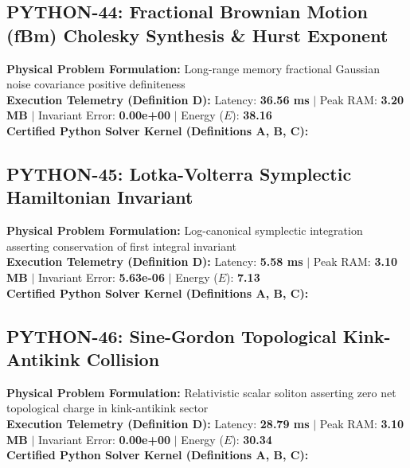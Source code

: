 \subsection{PYTHON-44: Fractional Brownian Motion (fBm) Cholesky Synthesis \& Hurst Exponent}
\textbf{Physical Problem Formulation:} Long-range memory fractional Gaussian noise covariance positive definiteness\\
\textbf{Execution Telemetry (Definition D):} Latency: \textbf{36.56 ms} $|$ Peak RAM: \textbf{3.20 MB} $|$ Invariant Error: \textbf{0.00e+00} $|$ Energy ($E$): \textbf{38.16}\\

\textbf{Certified Python Solver Kernel (Definitions A, B, C):}


\vspace{1em}
\subsection{PYTHON-45: Lotka-Volterra Symplectic Hamiltonian Invariant}
\textbf{Physical Problem Formulation:} Log-canonical symplectic integration asserting conservation of first integral invariant\\
\textbf{Execution Telemetry (Definition D):} Latency: \textbf{5.58 ms} $|$ Peak RAM: \textbf{3.10 MB} $|$ Invariant Error: \textbf{5.63e-06} $|$ Energy ($E$): \textbf{7.13}\\

\textbf{Certified Python Solver Kernel (Definitions A, B, C):}


\vspace{1em}
\subsection{PYTHON-46: Sine-Gordon Topological Kink-Antikink Collision}
\textbf{Physical Problem Formulation:} Relativistic scalar soliton asserting zero net topological charge in kink-antikink sector\\
\textbf{Execution Telemetry (Definition D):} Latency: \textbf{28.79 ms} $|$ Peak RAM: \textbf{3.10 MB} $|$ Invariant Error: \textbf{0.00e+00} $|$ Energy ($E$): \textbf{30.34}\\

\textbf{Certified Python Solver Kernel (Definitions A, B, C):}


\vspace{1em}
